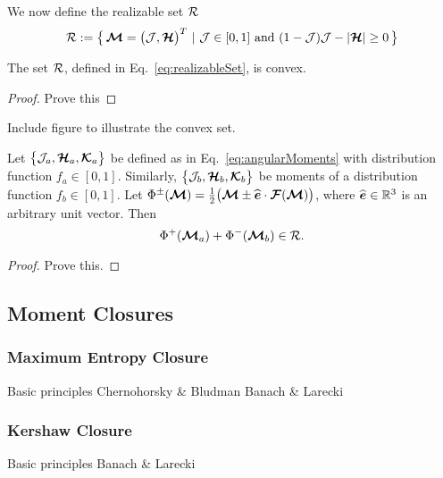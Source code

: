 We now define the realizable set $\mathcal{R}$
\begin{equation}
  \mathcal{R}:=\big\{\,\boldsymbol{\mathcal{M}}=\big(\mathcal{J},\boldsymbol{\mathcal{H}}\big)^{T}~|~\mathcal{J}\in[0,1]~\text{and}~(1-\mathcal{J})\mathcal{J}-|\boldsymbol{\mathcal{H}}|\ge0\,\big\}
  \label{eq:realizableSet}
\end{equation}

\begin{lemma}
  The set $\mathcal{R}$, defined in Eq.~\eqref{eq:realizableSet}, is convex.  
\end{lemma}
\begin{proof}
  Prove this
\end{proof}

Include figure to illustrate the convex set.  

\begin{lemma}
  Let $\big\{\mathcal{J}_{a},\boldsymbol{\mathcal{H}}_{a},\boldsymbol{\mathcal{K}}_{a}\big\}$ be defined as in Eq.~\eqref{eq:angularMoments} with distribution function $f_{a}\in[0,1]$.  
  Similarly, $\big\{\mathcal{J}_{b},\boldsymbol{\mathcal{H}}_{b},\boldsymbol{\mathcal{K}}_{b}\big\}$ be moments of a distribution function $f_{b}\in[0,1]$.  
  Let $\Phi^{\pm}(\boldsymbol{\mathcal{M}})=\frac{1}{2}\big(\boldsymbol{\mathcal{M}}\pm\widehat{\boldsymbol{e}}\cdot\boldsymbol{\mathcal{F}}(\boldsymbol{\mathcal{M}})\big)$, where $\widehat{\boldsymbol{e}}\in\mathbb{R}^{3}$ is an arbitrary unit vector.  
  Then
  \begin{equation}
    \Phi^{+}(\boldsymbol{\mathcal{M}}_{a})+\Phi^{-}(\boldsymbol{\mathcal{M}}_{b})\in\mathcal{R}.
  \end{equation}
\end{lemma}
\begin{proof}
  Prove this.
\end{proof}

\subsection{Moment Closures}

\subsubsection{Maximum Entropy Closure}
Basic principles
Chernohorsky \& Bludman
Banach \& Larecki

\subsubsection{Kershaw Closure}
Basic principles
Banach \& Larecki